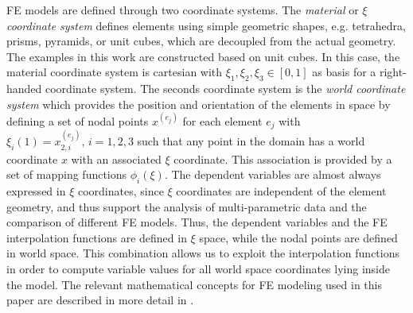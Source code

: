 \documentclass[journal]{vgtc}                %
\begin{document}
FE models are defined through two coordinate systems. The \emph{material} or \emph{$\xi$ coordinate system} defines elements using simple geometric shapes, e.g. tetrahedra, prisms, pyramids, or unit cubes, which are decoupled from the actual geometry. The examples in this work are constructed based on unit cubes. In this case, the material coordinate system is cartesian with $\xi_1, \xi_2, \xi_3 \in [0,1]$ as basis for a right-handed coordinate system. The seconds coordinate system is the \emph{world coordinate system} which provides the position and orientation of the elements in space by defining a set of nodal points $x^{(e_j)}$ for each element $e_j$ with $\xi_i(1)=x^{(e_j)}_{2,i},\, i=1,2,3$ such that any point in the domain has a world coordinate $x$ with an associated $\xi$ coordinate. This association is provided by a set of mapping functions $\phi_i(\xi)$. The dependent variables are almost always expressed in $\xi$ coordinates, since $\xi$ coordinates are independent of the element geometry, and thus support the analysis of multi-parametric data and the comparison of different FE models. Thus, the dependent variables and the FE interpolation functions are defined in $\xi$ space, while the nodal points are defined in world space. This combination allows us to exploit the interpolation functions in order to compute variable values for all world space coordinates lying inside the model. The relevant mathematical concepts for FE modeling used in this paper are described in more detail in \cite{wuensche03deformation,bradley97}.
%
\end{document}
